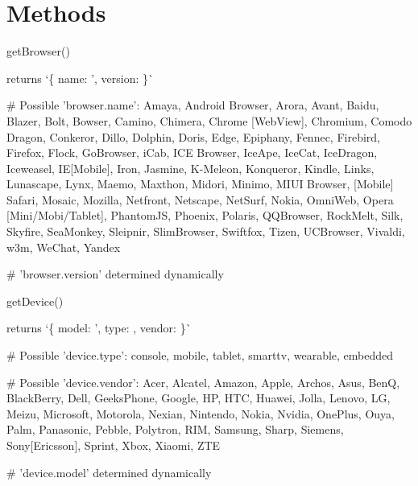\section*{Methods}


\begin{DoxyItemize}
\item {\ttfamily get\+Browser()}
\begin{DoxyItemize}
\item returns `\{ name\+: '\textquotesingle{}, version\+: \textquotesingle{}\textquotesingle{} \}\`{}
\end{DoxyItemize}
\end{DoxyItemize}


\begin{DoxyCode}
# Possible 'browser.name':
Amaya, Android Browser, Arora, Avant, Baidu, Blazer, Bolt, Bowser, Camino, Chimera, 
Chrome [WebView], Chromium, Comodo Dragon, Conkeror, Dillo, Dolphin, Doris, Edge, 
Epiphany, Fennec, Firebird, Firefox, Flock, GoBrowser, iCab, ICE Browser, IceApe, 
IceCat, IceDragon, Iceweasel, IE[Mobile], Iron, Jasmine, K-Meleon, Konqueror, Kindle, 
Links, Lunascape, Lynx, Maemo, Maxthon, Midori, Minimo, MIUI Browser, [Mobile] Safari, 
Mosaic, Mozilla, Netfront, Netscape, NetSurf, Nokia, OmniWeb, Opera [Mini/Mobi/Tablet], 
PhantomJS, Phoenix, Polaris, QQBrowser, RockMelt, Silk, Skyfire, SeaMonkey, Sleipnir, 
SlimBrowser, Swiftfox, Tizen, UCBrowser, Vivaldi, w3m, WeChat, Yandex

# 'browser.version' determined dynamically
\end{DoxyCode}



\begin{DoxyItemize}
\item {\ttfamily get\+Device()}
\begin{DoxyItemize}
\item returns `\{ model\+: '\textquotesingle{}, type\+: \textquotesingle{}\textquotesingle{}, vendor\+: \textquotesingle{}\textquotesingle{} \}\`{}
\end{DoxyItemize}
\end{DoxyItemize}


\begin{DoxyCode}
# Possible 'device.type':
console, mobile, tablet, smarttv, wearable, embedded

# Possible 'device.vendor':
Acer, Alcatel, Amazon, Apple, Archos, Asus, BenQ, BlackBerry, Dell, GeeksPhone, 
Google, HP, HTC, Huawei, Jolla, Lenovo, LG, Meizu, Microsoft, Motorola, Nexian, 
Nintendo, Nokia, Nvidia, OnePlus, Ouya, Palm, Panasonic, Pebble, Polytron, RIM, 
Samsung, Sharp, Siemens, Sony[Ericsson], Sprint, Xbox, Xiaomi, ZTE

# 'device.model' determined dynamically
\end{DoxyCode}




